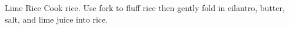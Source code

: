 \documentclass[../cookbook.tex]{subfiles}
\begin{document}
\begin{recipe}{Lime Rice}{}{}
    Cook rice.
    Use fork to fluff rice then gently fold in cilantro,
    butter, salt, and lime juice into rice.
\end{recipe}
\end{document}
